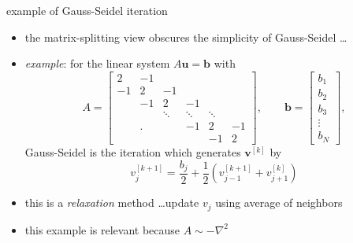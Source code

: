 \documentclass[10pt,
               svgnames,
               hyperref={colorlinks,citecolor=DeepPink4,linkcolor=FireBrick,urlcolor=Maroon},
               usepdftitle=false]{beamer}
\newcommand{\bb}{\mathbf{b}}
\newcommand{\bu}{\mathbf{u}}
\newcommand{\bv}{\mathbf{v}}
\newcommand{\grad}{\nabla}
\begin{document}
\begin{frame}{example of Gauss-Seidel iteration}
\begin{itemize}
\item the matrix-splitting view obscures the simplicity of Gauss-Seidel \dots
\item \emph{example}: for the linear system $A\bu=\bb$ with
    $$A = \begin{bmatrix} 2 & -1 & & & & \\ -1 & 2 & -1 & & & \\ & -1 & 2 & -1 & & \\ & & \ddots & \ddots & \ddots & \\ & \Big. & & -1 & 2 & -1 \\ & & & & -1 & 2 \end{bmatrix}, \qquad \bb = \begin{bmatrix} b_1 \\ b_2 \\ b_3 \\ \vdots \\ b_N \end{bmatrix},$$
Gauss-Seidel is the iteration which generates $\bv^{[k]}$ by
    $$v_j^{[k+1]} = \frac{b_j}{2} + \frac{1}{2} \left(v_{j-1}^{[k+1]} + v_{j+1}^{[k]}\right)$$
\item this is a \emph{relaxation} method \dots update $v_j$ using average of neighbors
\item this example is relevant because $A \sim -\grad^2$
\end{itemize}
\end{frame}
\end{document}

